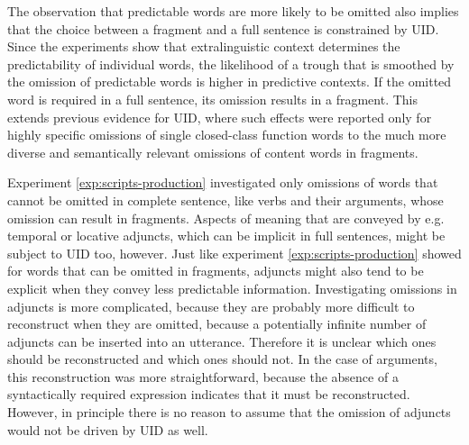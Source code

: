 The observation that predictable words are more likely to be omitted also implies that the choice between a fragment and a full sentence is constrained by UID. Since the experiments show that extralinguistic context determines the predictability of individual words, the likelihood of a trough that is smoothed by the omission of predictable words is higher in predictive contexts. If the omitted word is required in a full sentence, its omission results in a fragment. This extends previous evidence for UID, where such effects were reported only for highly specific omissions of single closed-class function words to the much more diverse and semantically relevant omissions of content words in fragments. 

Experiment \ref{exp:scripts-production} investigated only omissions of words that cannot be omitted in complete sentence, like verbs and their arguments, whose omission can result in fragments. Aspects of meaning that are conveyed by e.g. temporal or locative adjuncts, which can be implicit in full sentences, might be subject to UID too, however. Just like experiment \ref{exp:scripts-production} showed for words that can be omitted in fragments, adjuncts might also tend to be explicit when they convey less predictable information. Investigating omissions in adjuncts is more complicated, because they are probably more difficult to reconstruct when they are omitted, because a potentially infinite number of adjuncts can be inserted into an utterance. Therefore it is unclear which ones should be reconstructed and which ones should not. In the case of arguments, this reconstruction was more straightforward, because the absence of a syntactically required expression indicates that it must be reconstructed. However, in principle there is no reason to assume that the omission of adjuncts would not be driven by UID as well.

